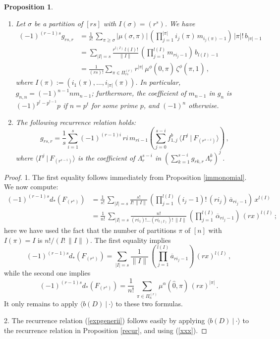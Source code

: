 \documentclass[a4paper,12pt]{amsart}
\newtheorem{prop}[equation]{Proposition}
\theoremstyle{definition}
\numberwithin{equation}{section}
\newcommand{\s}{\sigma}
\newcommand{\z}{\widehat{0}}
\newcommand{\oi}[1]{\mbox{$\widehat{1}_{#1}$}}
\newcommand{\br}[1]{\langle#1\rangle}
\newcommand{\dual}[2]{\br{#1 \:|\: #2}}
\begin{document}
\begin{prop}\label{expgener}\hfill
\begin{enumerate}
\item Let $\s$ be a partition of $[rs]$ with $I(\s)=(r^s)$. We have 
\begin{align}\label{expgeneri}
 (-1)^{(r-1)s}g_{rs,r}&=\frac{1}{s!}\,\sum_{\pi\ge\s}|\mu(\s,\pi)|\,\left(\prod_{j=1}^{|\pi|}i_j(\pi)\,m_{i_j(\pi)-1}\right)\,|\pi|!\,b_{|\pi|-1}\\
&=\sum_{|I|=s}\frac{r^{l(I)}\,l(I)!}{\|I\|}\,\left(\prod_{j=1}^{l(I)}m_{ri_j-1}\right)\,b_{l(I)-1}\nonumber\\
&=\frac{1}{(rs)!}\sum_{\pi\in\varPi_{rs}^{(r)}}r^{|\pi|}\,\mu^\phi(\z,\pi)\,\zeta^\phi(\pi,\oi{})\,,\nonumber
\end{align}
where $I(\pi):=(i_1(\pi),\ldots,i_{|\pi|}(\pi))$. In particular, $g_{n,n}=(-1)^{n-1}n m_{n-1}$; furthermore, the coefficient of $m_{n-1}$ in $g_n$ is $(-1)^{p^t-p^{t-1}}p$ if $n=p^t$ for some prime $p$, and $(-1)^n$ otherwise. 
\item The following recurrence relation holds:
\begin{equation}\label{expgenerii}
g_{rs,r}=\frac{1}{s}\sum_{i=1}^s (-1)^{(r-1)i}\,ri\,m_{ri-1}\left(\sum_{j=0}^{s-i}f_{1,j}^b\,\dual{\varGamma^j}{F_{(r^{s-i})}}\right)\,,
\end{equation}
where $\dual{\varGamma^j}{F_{(r^{s-i})}}$ is the coefficient of $\varLambda_r^{s-i}$ in $\left(\sum_{k=1}^{s-i}g_{rk,r}\,\varLambda_r^k\right)^j\,$.
\end{enumerate}
\end{prop}
\begin{proof}
1. The first equality follows immediately from Proposition \ref{immonomial}. We now compute:
\begin{align*}
(-1)^{(r-1)s}d_*(F_{(r^s)})&=\frac{1}{s!}\,\sum_{|I|=s}\frac{s!}{I!\,\|I\|}\,\left(\prod_{j=1}^{l(I)}(i_j-1)!\,(ri_j)\,\overline{a}_{ri_j-1}\right)\,x^{l(I)}\\
&=\frac{1}{n!}\,\sum_{|I|=s}\frac{n!}{(ri_1)!\ldots(ri_{l(I)})!\,\|I\|}\,\left(\prod_{j=1}^{l(I)}\overline{\alpha}_{ri_j-1}\right)\,(rx)^{l(I)}\,;
\end{align*}
here we have used the fact that the number of partitions $\pi$ of $[n]$ with $I(\pi)=I$ is $n!/(I!\,\|I\|)$. The first equality implies
\[(-1)^{(r-1)s}d_*(F_{(r^s)})=\sum_{|I|=s}\frac{1}{\|I\|}\,\left(\prod_{j=1}^{l(I)}\overline{a}_{ri_j-1}\right)\,(rx)^{l(I)}\,,\]
while the second one implies
\[(-1)^{(r-1)s}d_*(F_{(r^s)})=\frac{1}{n!}\,\sum_{\pi\in\varPi_n^{(r)}}\mu^\alpha(\z,\pi)\,(rx)^{|\pi|}\,.\]
It only remains to apply $\dual{b(D)}{\cdot}$ to these two formulas. 

2. The recurrence relation (\ref{expgenerii}) follows easily by applying $\dual{b(D)}{\cdot}$ to the recurrence relation in Proposition \ref{recur}, and using (\ref{xxx}). 
\end{proof}
\end{document}
